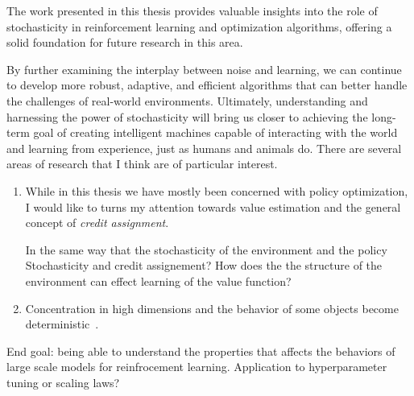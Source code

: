The work presented in this thesis provides valuable insights into the role of stochasticity in reinforcement learning and optimization algorithms, offering a solid foundation for future research in this area.

By further examining the interplay between noise and learning, we can continue to develop more robust, adaptive, and efficient algorithms that can better handle the challenges of real-world environments. Ultimately, understanding and harnessing the power of stochasticity will bring us closer to achieving the long-term goal of creating intelligent machines capable of interacting with the world and learning from experience, just as humans and animals do.
There are several areas of research that I think are of particular interest.


\begin{enumerate}
    \item While in this thesis we have mostly been concerned with policy optimization, I would like to turns my attention towards value estimation and the general concept of \emph{credit assignment}. 
    
    In the same way that the stochasticity of the environment and the policy 
    Stochasticity and credit assignement? How does the the structure of the
environment can effect learning of the value function?

\item Concentration in high dimensions and the behavior of some objects become
deterministic~\citep{thomas2022role}.
\end{enumerate}
 
End goal: being able to understand the properties that affects the behaviors of
large scale models for reinfrocement learning.
 Application to hyperparameter tuning or scaling laws?






